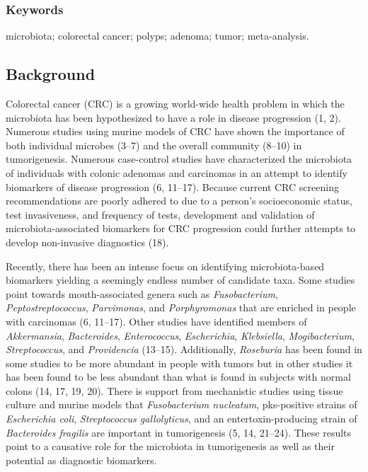 \documentclass[12pt,]{article}
\begin{document}
\subsubsection{Keywords}\label{keywords}

microbiota; colorectal cancer; polyps; adenoma; tumor; meta-analysis.

\newpage

\subsection{Background}\label{background}

Colorectal cancer (CRC) is a growing world-wide health problem in which
the microbiota has been hypothesized to have a role in disease
progression (1, 2). Numerous studies using murine models of CRC have
shown the importance of both individual microbes (3--7) and the overall
community (8--10) in tumorigenesis. Numerous case-control studies have
characterized the microbiota of individuals with colonic adenomas and
carcinomas in an attempt to identify biomarkers of disease progression
(6, 11--17). Because current CRC screening recommendations are poorly
adhered to due to a person's socioeconomic status, test invasiveness,
and frequency of tests, development and validation of
microbiota-associated biomarkers for CRC progression could further
attempts to develop non-invasive diagnostics (18).

Recently, there has been an intense focus on identifying
microbiota-based biomarkers yielding a seemingly endless number of
candidate taxa. Some studies point towards mouth-associated genera such
as \emph{Fusobacterium}, \emph{Peptostreptococcus}, \emph{Parvimonas},
and \emph{Porphyromonas} that are enriched in people with carcinomas (6,
11--17). Other studies have identified members of \emph{Akkermansia},
\emph{Bacteroides}, \emph{Enterococcus}, \emph{Escherichia},
\emph{Klebsiella}, \emph{Mogibacterium}, \emph{Streptococcus}, and
\emph{Providencia} (13--15). Additionally, \emph{Roseburia} has been
found in some studies to be more abundant in people with tumors but in
other studies it has been found to be less abundant than what is found
in subjects with normal colons (14, 17, 19, 20). There is support from
mechanistic studies using tissue culture and murine models that
\emph{Fusobacterium nucleatum}, pks-positive strains of
\emph{Escherichia coli}, \emph{Streptococcus gallolyticus}, and an
entertoxin-producing strain of \emph{Bacteroides fragilis} are important
in tumorigenesis (5, 14, 21--24). These results point to a causative
role for the microbiota in tumorigenesis as well as their potential as
diagnostic biomarkers.
\end{document}
